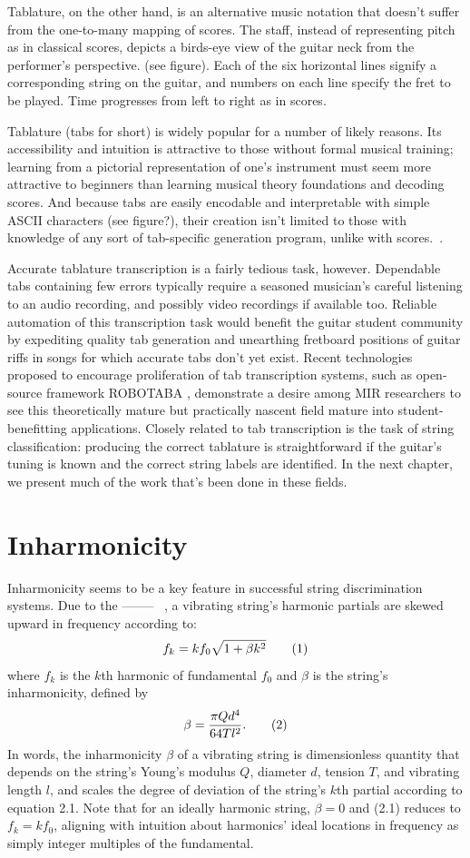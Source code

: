\documentclass[12pt]{cmuthesis}
\newcommand\addtag{\refstepcounter{equation}\tag{\theequation}}
\begin{document}
Tablature, on the other hand, is an alternative music notation that doesn't suffer from the one-to-many mapping of scores. The staff, instead of representing pitch as in classical scores, depicts a birds-eye view of the guitar neck from the performer's perspective. (see figure). Each of the six horizontal lines signify a corresponding string on the guitar, and numbers on each line specify the fret to be played. Time progresses from left to right as in scores.

Tablature (tabs for short) is widely popular for a number of likely reasons. Its accessibility and intuition is attractive to those without formal musical training; learning from a pictorial representation of one's instrument must seem more attractive to beginners than learning musical theory foundations and decoding scores. And because tabs are easily encodable and interpretable with simple ASCII characters (see figure?), their creation isn't limited to those with knowledge of any sort of tab-specific generation program, unlike with scores.~\cite{macrae2006}.

Accurate tablature transcription is a fairly tedious task, however. Dependable tabs containing few errors typically require a seasoned musician's careful listening to an audio recording, and possibly video recordings if available too. Reliable automation of this transcription task would benefit the guitar student community by expediting quality tab generation and unearthing fretboard positions of guitar riffs in songs for which accurate tabs don't yet exist. Recent technologies proposed to encourage proliferation of tab transcription systems, such as open-source framework ROBOTABA \cite{burlet}, demonstrate a desire among MIR researchers to see this theoretically mature but practically nascent field mature into student-benefitting applications. Closely related to tab transcription is the task of string classification: producing the correct tablature is straightforward if the guitar's tuning is known and the correct string labels are identified. In the next chapter, we present much of the work that's been done in these fields.

\section{Inharmonicity} Inharmonicity seems to be a key feature in successful string discrimination systems. Due to the -------- ~\cite{fletcher1998}, a vibrating string's harmonic partials are skewed upward in frequency according to: 
\[
f_k = kf_{0}\sqrt{1+\beta k^2} \addtag
\]
where $f_k$ is the $k$th harmonic of fundamental $f_0$ and $\beta$ is the string's inharmonicity, defined by
\[
\beta = \frac{\pi Q d^4}{64 T l^2}. \addtag
\]
In words, the inharmonicity $\beta$ of a vibrating string is dimensionless quantity that depends on the string's Young's modulus $Q$, diameter $d$, tension $T$, and vibrating length $l$, and scales the degree of deviation of the string's $k$th partial according to equation 2.1. Note that for an ideally harmonic string, $\beta = 0$ and (2.1) reduces to $f_k = kf_0$, aligning with intuition about harmonics' ideal locations in frequency as simply integer multiples of the fundamental.
\end{document}
